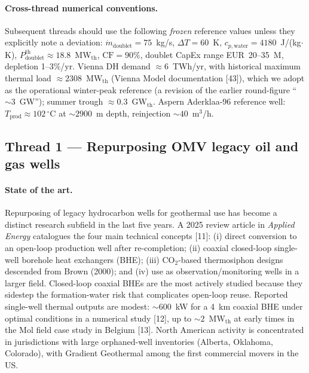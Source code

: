 \documentclass{article}
\begin{document}
\paragraph{Cross-thread numerical conventions.} Subsequent threads
should use the following \emph{frozen} reference values unless
they explicitly note a deviation:
$\dot m_{\mathrm{doublet}} = 75$~kg/s,
$\Delta T = 60$~K,
$c_{p,\mathrm{water}} = 4180$~J/(kg$\cdot$K),
$P_{\mathrm{doublet}}^{\mathrm{th}} \approx 18.8$~MW$_{\mathrm{th}}$,
$\mathrm{CF} = 90\%$, doublet CapEx range
EUR~20--35~M, depletion 1--3\%/yr. Vienna DH demand
$\approx 6$~TWh/yr, with historical maximum thermal load
$\approx 2308$~MW$_{\mathrm{th}}$ (Vienna Model documentation [43]),
which we adopt as the operational winter-peak reference (a
revision of the earlier round-figure ``$\sim 3$~GW''); summer
trough $\approx 0.3$~GW$_{\mathrm{th}}$. Aspern
Aderklaa-96 reference well: $T_{\mathrm{prod}}\approx 102\,^\circ$C
at $\sim 2900$~m depth, reinjection $\sim 40$~m$^3$/h.

\subsection*{Thread 1 --- Repurposing OMV legacy oil and gas wells}

\paragraph{State of the art.}
Repurposing of legacy hydrocarbon wells for geothermal use has become a
distinct research subfield in the last five years. A 2025 review article
in \emph{Applied Energy} catalogues the four main technical concepts
[11]: (i) direct conversion to an open-loop production
well after re-completion; (ii) coaxial closed-loop single-well borehole heat
exchangers (BHE); (iii) CO$_2$-based thermosiphon designs descended from
Brown (2000); and (iv) use as observation/monitoring wells in a larger
field. Closed-loop coaxial BHEs are the most actively studied because they
sidestep the formation-water risk that complicates open-loop reuse.
Reported single-well thermal outputs are modest: $\sim 600$~kW for a
4~km coaxial BHE under optimal conditions in a numerical study
[12], up to $\sim 2$~MW$_\mathrm{th}$ at early times in the
Mol field case study in Belgium [13]. North American activity is
concentrated in jurisdictions with large orphaned-well inventories
(Alberta, Oklahoma, Colorado), with Gradient Geothermal among the first
commercial movers in the US.
\end{document}
